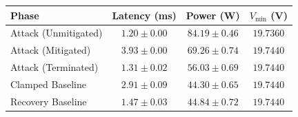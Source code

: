 \begin{tabular}{lccc}
\toprule
Phase & Latency (ms) & Power (W) & $V_{\min}$ (V) \\
\midrule
Attack (Unmitigated) & $1.20 \pm 0.00$ & $84.19 \pm 0.46$ & $19.7360$ \\
Attack (Mitigated) & $3.93 \pm 0.00$ & $69.26 \pm 0.74$ & $19.7440$ \\
Attack (Terminated) & $1.31 \pm 0.02$ & $56.03 \pm 0.69$ & $19.7440$ \\
Clamped Baseline & $2.91 \pm 0.09$ & $44.30 \pm 0.65$ & $19.7440$ \\
Recovery Baseline & $1.47 \pm 0.03$ & $44.84 \pm 0.72$ & $19.7440$ \\
\bottomrule
\end{tabular}
